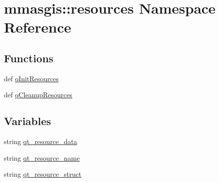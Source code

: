 \hypertarget{namespacemmasgis_1_1resources}{
\section{mmasgis::resources Namespace Reference}
\label{namespacemmasgis_1_1resources}
}
\subsection*{Functions}
\begin{DoxyCompactItemize}
\item 
def \hyperlink{namespacemmasgis_1_1resources_ae38ee61ff14fc0b66dfb8dbf3d7f302b}{qInitResources}
\item 
def \hyperlink{namespacemmasgis_1_1resources_a24a854eb9fde6ada0b003284417addfd}{qCleanupResources}
\end{DoxyCompactItemize}
\subsection*{Variables}
\begin{DoxyCompactItemize}
\item 
string \hyperlink{namespacemmasgis_1_1resources_a1caf04f1a8244ac67c90e332ea20aba2}{qt\_\-resource\_\-data}
\item 
string \hyperlink{namespacemmasgis_1_1resources_a81b69b88b6fe79a965a71e645e9b775d}{qt\_\-resource\_\-name}
\item 
string \hyperlink{namespacemmasgis_1_1resources_ac8b49b9b94319f35b2b058e3c929e8f4}{qt\_\-resource\_\-struct}
\end{DoxyCompactItemize}



